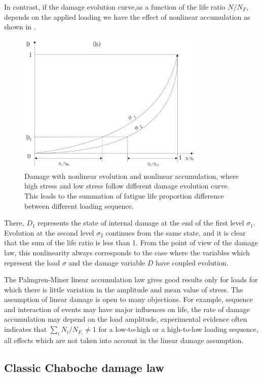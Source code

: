 In contrast, if the damage evolution curve,as a function of the life ratio $N/N_F$, depends on the applied loading we have the effect of nonlinear accumulation as shown in . 
\begin{figure}[!h]
	\centering
	\includegraphics[width=0.8\textwidth]{figures//nonlinearaccumulation.png} 
	\caption{Damage with nonlinear evolution and nonlinear accumulation, where high stress and low stress follow different damage evolution curve. This leads to the summation of fatigue life proportion difference between different loading sequence.}
	\label{nonlinear accumulation}
\end{figure}
There, $D_1$ represents the state of internal damage at the end of the first level $\sigma_1$. Evolution at the second level $\sigma_2$ continues from the same state, and it is clear that the sum of the life ratio is less than 1. From the point of view of the damage law, this nonlinearity always corresponds to the case where the variables which represent the load $\sigma$ and the damage variable $D$ have coupled evolution.

The Palmgren-Miner linear accumulation law gives good results only for loads for which there is little variation in the amplitude and mean value of stress. The assumption of linear damage is open to many objections. For example, sequence and interaction of events may have major influences on life, the rate of damage accumulation may depend on the load amplitude, experimental evidence often indicates that $\sum_{i}N_i/N_{F_i}\neq 1$ for a low-to-high or a high-to-low loading sequence, all effects which are not taken into account in the linear damage assumption.

\newpage
\subsection{Classic Chaboche damage law}

